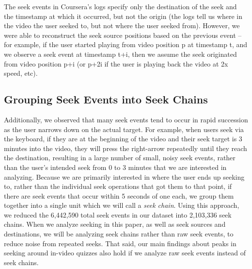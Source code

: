 \documentclass{sigchi}
\begin{document}
The seek events in Coursera's logs specify only the destination of the seek and the timestamp at which it occurred, but not the origin (the logs tell us where in the video the user seeked to, but not where the user seeked from). However, we were able to reconstruct the seek source positions based on the previous event -- for example, if the user started playing from video position p at timestamp t, and we observe a seek event at timestamp t+i, then we assume the seek originated from video position p+i (or p+2i if the user is playing back the video at 2x speed, etc).

\subsection{Grouping Seek Events into Seek Chains}

Additionally, we observed that many seek events tend to occur in rapid succession as the user narrows down on the actual target. For example, when users seek via the keyboard, if they are at the beginning of the video and their seek target is 3 minutes into the video, they will press the right-arrow repeatedly until they reach the destination, resulting in a large number of small, noisy seek events, rather than the user's intended seek from 0 to 3 minutes that we are interested in analyzing. Because we are primarily interested in where the user ends up seeking to, rather than the individual seek operations that got them to that point, if there are seek events that occur within 5 seconds of one each, we group them together into a single unit which we will call a \textit{seek chain}. Using this approach, we reduced the 6,442,590 total seek events in our dataset into 2,103,336 seek chains. When we analyze seeking in this paper, as well as seek sources and destinations, we will be analyzing seek chains rather than raw seek events, to reduce noise from repeated seeks. That said, our main findings about peaks in seeking around in-video quizzes also hold if we analyze raw seek events instead of seek chains.

\end{document}
